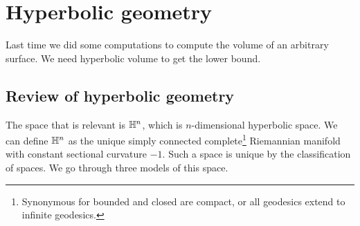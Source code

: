 \section{Hyperbolic geometry} 
Last time we did some computations to compute the volume of an arbitrary surface. We need hyperbolic volume to get the lower bound.
\subsection{Review of hyperbolic geometry}
The space that is relevant is $\mathbb{H}^n $, which is $n$-dimensional hyperbolic space. We can define $\mathbb{H}^n $ as the unique simply connected complete\footnote{Synonymous for bounded and closed are compact, or all geodesics extend to infinite geodesics.} Riemannian manifold with constant sectional curvature $-1$. Such a space is unique by the classification of spaces. We go through three models of this space.
